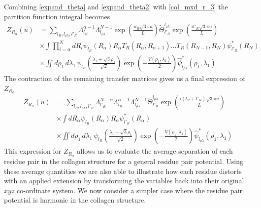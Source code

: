 %
Combining \eqref{expand_theta} and \eqref{expand_theta2} with \eqref{col_mxd_r_3} the partition function integral becomes
%
\begin{align}
\label{col_mxd_r_4}
Z_{R_{\alpha}}\left(u\right)&=\sum_{l_R,l_{\rho\lambda},l'_R}\Lambda_{l_{R}}^{\alpha-1}\Lambda_{l_{\rho\lambda}}^{N-1}\exp\left(\frac{il_{R}\sqrt{3}\pi u}{L}\right)\tilde{\Theta}_{l'_{R}}^{l_{\rho\lambda}}\exp\left(\frac{il'_{R}\sqrt{3}\pi u}{L}\right)\nonumber\\
&\times\int\prod^{N}_{i=\alpha}dR_i \psi_{l_R}\left(R_{\alpha}\right)R_{\alpha}T_{R}(R_{\alpha},R_{\alpha+1})...T_{R}(R_{N-1},R_{N})\psi^{*}_{l'_R}\left(R_{N}\right)\nonumber\\
&\times\iint d\rho_1\,d\lambda_1\,\psi_{l_R}\left(\frac{\lambda_1 + \sqrt{3}\rho_1}{\sqrt{2}}\right)\exp\left(-\frac{V\left(\rho_{1},\lambda_{1}\right)}{2}\right)\hat{\psi}^{*}_{l_{\rho\lambda}}\left(\rho_{1},\lambda_{1}\right)
\end{align}
%
The contraction of the remaining transfer matrices gives us a final expression of $Z_{R_{\alpha}}$ 
%
\begin{align}
\label{col_mxd_r_5}
Z_{R_{\alpha}}\left(u\right)&=\sum_{l_R,l_{\rho\lambda},l'_R}\Lambda_{l'_{R}}^{N-\alpha}\Lambda_{l_{R}}^{\alpha-1}\Lambda_{l_{\rho\lambda}}^{N-1}\tilde{\Theta}_{l'_{R}}^{l_{\rho\lambda}}\exp\left(\frac{i(l_{R}+l'_{R})\sqrt{3}\pi u}{L}\right)\nonumber\\
&\times\int dR_\alpha \psi_{l_R}\left(R_{\alpha}\right)R_{\alpha}\psi^{*}_{l'_R}\left(R_{\alpha}\right)\nonumber\\
&\times\iint d\rho_1\,d\lambda_1\,\psi_{l_R}\left(\frac{\lambda_1 + \sqrt{3}\rho_1}{\sqrt{2}}\right)\exp\left(-\frac{V\left(\rho_{1},\lambda_{1}\right)}{2}\right)\hat{\psi}^{*}_{l_{\rho\lambda}}\left(\rho_{1},\lambda_{1}\right)
\end{align}
%
This expression for $Z_{R_{\alpha}}$ allows us to evaluate the average separation of each residue pair in the collagen structure for a general residue pair potential. Using these average quantities we are also able to illustrate how each residue distorts with an applied extension by transforming the variables back into their original $xyz$ co-ordinate system. We now consider a simpler case where the residue pair potential is harmonic in the collagen structure.

